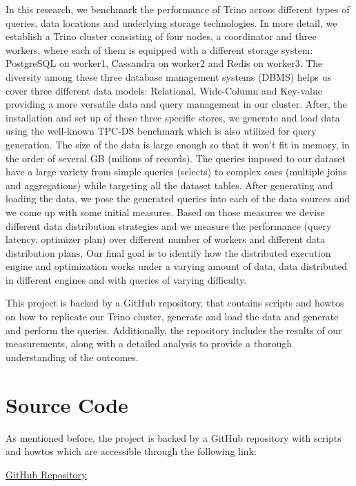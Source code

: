 \documentclass[conference]{IEEEtran}
\begin{document}
In this research, we benchmark the performance of Trino across different types of queries, data locations and underlying
storage technologies. In more detail, we establish a Trino cluster consisting of four nodes, a coordinator and three workers,
where each of them is equipped with a different storage system: PostgreSQL on worker1, Cassandra on worker2 and Redis on worker3.
The diversity among these three database management systems (DBMS) helps us cover three different data models:
Relational, Wide-Column and Key-value providing a more versatile data and query management in our cluster. After, the installation and set up of those three specific stores, we generate and load
data using the well-known TPC-DS \cite{b8} benchmark which is also utilized for query generation.
The size of the data is large enough so that it won't fit in memory, in the order of several GB (milions of records).
The queries imposed to our dataset have a large variety from simple queries (selects) to complex ones (multiple joins and aggregations) while targeting all the dataset tables.
After generating and loading the data, we pose the generated queries into each of the data sources and we come up with some
initial measures. Based on those measures we devise different data distribution strategies and we measure the performance
(query latency, optimizer plan) over different number of workers and different data distribution plans. Our final goal is to
identify how the distributed execution engine and optimization works under a varying amount of data, data distributed in
different engines and with queries of varying difficulty.

This project is backed by a GitHub repository, that contains scripts and howtos on how to replicate our Trino cluster, generate and load the data and
generate and perform the queries. Additionally, the repository includes the results of our measurements, along with a detailed analysis to provide a
thorough understanding of the outcomes.



\section{Source Code}
As mentioned before, the project is backed by a GitHub repository with scripts and howtos which are accessible
through the following link:

\begin{center}
    \textcolor{linkblue}{\underline{\href{https://github.com/alex1on/Information-Systems-NTUA}{GitHub Repository}}}
\end{center}
\end{document}
